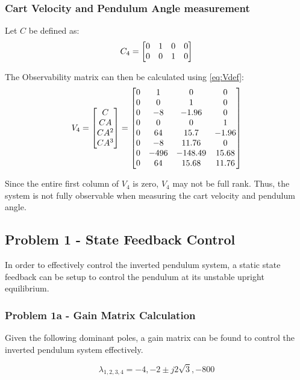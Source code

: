 \documentclass[]{article}
\begin{document}
			
		\subsubsection{Cart Velocity and Pendulum Angle measurement}
			Let $C$ be defined as:
			\begin{equation}
				C_4 = \mqty[0	&1	&0	&0\\
							0	&0	&1	&0]
			\end{equation}
			
			The Observability matrix can then be calculated using \eqref{eq:Vdef}:
			\begin{equation}
				V_4 = \mqty[C\\ CA\\ CA^2\\ CA^3]
					= \mqty[0	&1		&0		&0\\
							0	&0		&1		&0\\
							0	&-8		&-1.96	&0\\
							0	&0		&0		&1\\
							0	&64		&15.7	&-1.96\\
							0	&-8		&11.76	&0\\
							0	&-496	&-148.49&15.68\\
							0	&64		&15.68	&11.76] \label{eq:v4def}
			\end{equation}
			
			Since the entire first column of $V_4$ is zero, $V_4$ may not be full rank. Thus, the system is not fully observable when measuring the cart velocity and pendulum angle.
	
	\newpage	
	\subsection{Problem 1 - State Feedback Control}
		\label{sec:PSD_pblm1}
		In order to effectively control the inverted pendulum system, a static state feedback can be setup to control the pendulum at its unstable upright equilibrium.
		
		
		\subsubsection{Problem 1a - Gain Matrix Calculation}
		
			Given the following dominant poles, a gain matrix can be found to control the inverted pendulum system effectively.
			
			\begin{equation}
				\lambda_{1,2,3,4} = {-4, -2 \pm j 2 \sqrt{3}, -800}
				\label{eq:Desiered_poles}
			\end{equation}
		
\end{document}
